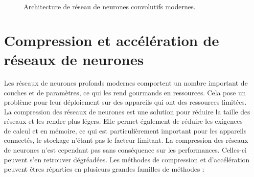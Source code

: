\begin{figure}
\centering
{}
\hspace{0.05\textwidth}
\caption{Architecture de réseau de neurones convolutifs modernes.}
\end{figure}


\section*{Compression et accélération de réseaux de neurones}

Les réseaux de neurones profonds modernes comportent un nombre important de
couches et de paramètres, ce qui les rend gourmands en ressources. Cela pose un
problème pour leur déploiement sur des appareils qui ont des ressources
limitées. La compression des réseaux de neurones est une solution pour réduire
la taille des réseaux et les rendre plus légers. Elle permet également de
réduire les exigences de calcul et en mémoire, ce qui est particulièrement
important pour les appareils connectés, le stockage n'étant pas le facteur
limitant. La compression des réseaux de neurones n'est cependant pas sans
conséquence sur les performances. Celles-ci peuvent s'en retrouver dégréadées.
Les méthodes de compression et d'accélération peuvent êtres réparties en
plusieurs grandes familles de méthodes :\\

